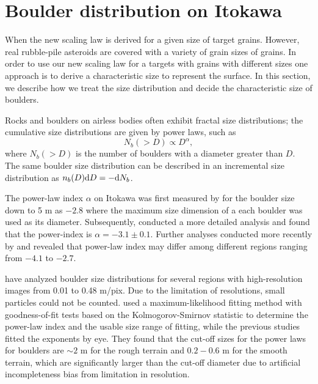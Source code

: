 \documentclass[3p,authoryear]{elsarticle}
\begin{document}
 \appendix
\section{Boulder distribution on Itokawa} \label{boulder-dist}
When the new scaling law is derived for a given size of target grains. However, real rubble-pile asteroids are covered with a variety of grain sizes of grains.
In order to use our new scaling law for a targets with grains with different sizes one approach is to derive a characteristic size to represent the surface. In this section, we describe how we treat the size distribution and decide the characteristic size of boulders.

Rocks and boulders on airless bodies often exhibit fractal size distributions; the cumulative size distributions are given by power laws, such as
\begin{equation}
	N_b(>D) \propto D^{\alpha}, \label{cdf}
\end{equation}
where $N_b(>D)$ is the number of boulders with a diameter greater than $D$.
The same boulder size distribution can be described in an incremental size distribution as $n_b(D){\rm d} D =- {\rm d} N_b$.

The power-law index $\alpha$ on Itokawa was first measured by \citet{saito2006} for the boulder size down to 5 m as $-2.8$ where the maximum size dimension of a each boulder was used as its diameter.
Subsequently, \citet{michikami2008} conducted a more detailed analysis and found that the power-index is $\alpha=-3.1\pm 0.1$.
Further analyses conducted more recently by \citet{mazrouei2014} and \citet{tancredi2015} revealed that power-law index may differ among different regions ranging from $-4.1$ to $-2.7$.

\citet{tancredi2015} have analyzed boulder size distributions for several regions with high-resolution images from 0.01 to 0.48 m/pix.
Due to the limitation of resolutions, small particles could not be counted.
\citet{tancredi2015} used a maximum-likelihood fitting method with goodness-of-fit tests based on the Kolmogorov-Smirnov statistic to determine the power-law index and the usable size range of fitting, while the previous studies fitted the exponents by eye.
They found that the cut-off sizes for the power laws for boulders are $\sim 2$ m for the rough terrain and $0.2 - 0.6$ m for the smooth terrain, which are significantly larger than the cut-off diameter due to artificial incompleteness bias from limitation in resolution.
\end{document}
